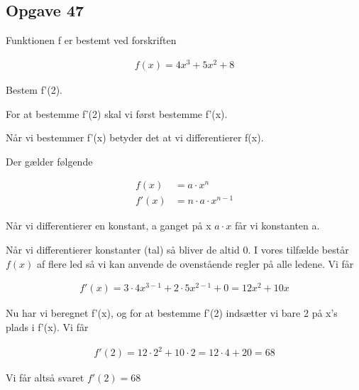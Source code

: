 \subsection{Opgave 47}

Funktionen f er bestemt ved forskriften 

\begin{align*}
    f(x) = 4x^3 + 5x^2 + 8
\end{align*}

Bestem f'(2).

\ans

For at bestemme f'(2) skal vi først bestemme f'(x).

Når vi bestemmer f'(x) betyder det at vi differentierer f(x).

Der gælder følgende 

\begin{align*}
    f(x) &= a\cdot x^n\\
    f'(x) &= n\cdot a \cdot x^{n-1}
\end{align*}

Når vi differentierer en konstant, a ganget på x $a\cdot x$ får vi konstanten a.

Når vi differentierer konstanter (tal) så bliver de altid 0.
I vores tilfælde består $f(x)$ af flere led så vi kan anvende de ovenstående regler på alle ledene. Vi får

\begin{align*}
    f'(x) = 3\cdot 4x^{3-1} + 2\cdot 5x^{2-1} + 0 = 12x^2 + 10x
\end{align*}

Nu har vi beregnet f'(x), og for at bestemme f'(2) indsætter vi bare 2 på x's plads i f'(x). Vi får

\begin{align*}
    f'(2) = 12\cdot 2^2 + 10\cdot 2 = 12\cdot 4 + 20 = 68
\end{align*}

Vi får altså svaret $f'(2) = 68$